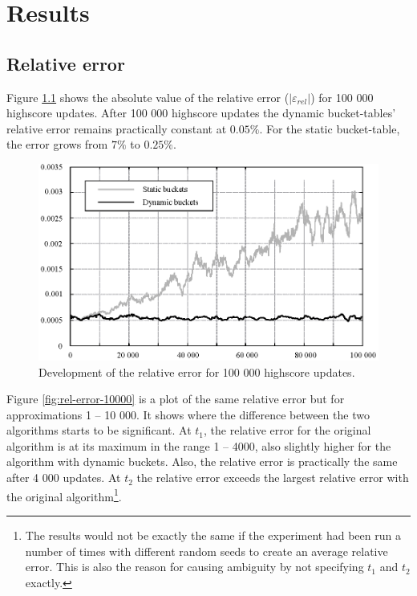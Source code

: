 \chapter{\label{results}Results}



\section{Relative error}

Figure \ref{fig:rel-error-100000} shows the absolute value of the relative error ($|\varepsilon_{rel}|$) for 100 000 highscore updates. After 100 000 highscore updates the dynamic bucket-tables' relative error remains practically constant at $0.05 \%$. For the static bucket-table, the error grows from $7 \%$ to $0.25 \%$.

\begin{figure}[h!]
  \centering
  \caption{Development of the relative error for 100 000 highscore updates.}
  \label{fig:rel-error-100000}
  \includegraphics[width=13cm]{img/rel-error-100000.eps}
\end{figure}

Figure \ref{fig:rel-error-10000} is a plot of the same relative error but for approximations 1 -- 10 000. It shows where the difference between the two algorithms starts to be significant. At $t_1$, the relative error for the original algorithm is at its maximum in the range 1 -- 4000, also slightly higher for the algorithm with dynamic buckets. Also, the relative error is practically the same after 4 000 updates. At $t_2$ the relative error exceeds the largest relative error with the original algorithm\footnote{The results would not be exactly the same if the experiment had been run a number of times with different random seeds to create an average relative error. This is also the reason for causing ambiguity by not specifying $t_1$ and $t_2$ exactly.}.


